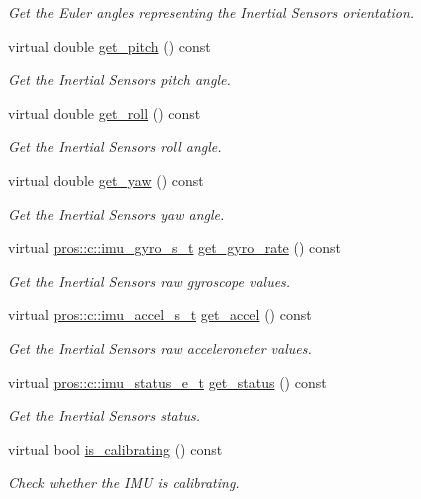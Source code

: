 \begin{DoxyCompactItemize}
\begin{DoxyCompactList}\small\item\em Get the Euler angles representing the Inertial Sensor\textquotesingle{}s orientation. \end{DoxyCompactList}\item 
virtual double \hyperlink{classpros_1_1Imu_a9d9e7ad1da6ea8877c48e1b4fadfe8ee}{get\+\_\+pitch} () const
\begin{DoxyCompactList}\small\item\em Get the Inertial Sensor\textquotesingle{}s pitch angle. \end{DoxyCompactList}\item 
virtual double \hyperlink{classpros_1_1Imu_a8ec8c7bbb7ee9d9d1c9dca5d992c57b1}{get\+\_\+roll} () const
\begin{DoxyCompactList}\small\item\em Get the Inertial Sensor\textquotesingle{}s roll angle. \end{DoxyCompactList}\item 
virtual double \hyperlink{classpros_1_1Imu_aa2dd2dec5b1a91d4358c23afd8f0f1bd}{get\+\_\+yaw} () const
\begin{DoxyCompactList}\small\item\em Get the Inertial Sensor\textquotesingle{}s yaw angle. \end{DoxyCompactList}\item 
virtual \hyperlink{imu_8h_a5b9e240cfb181cce3c741e29efbbbf23}{pros\+::c\+::imu\+\_\+gyro\+\_\+s\+\_\+t} \hyperlink{classpros_1_1Imu_a632aecd3cf0866827ba6521dc19f357d}{get\+\_\+gyro\+\_\+rate} () const
\begin{DoxyCompactList}\small\item\em Get the Inertial Sensor\textquotesingle{}s raw gyroscope values. \end{DoxyCompactList}\item 
virtual \hyperlink{imu_8h_a70eb3173193f4f46266eade4c243f662}{pros\+::c\+::imu\+\_\+accel\+\_\+s\+\_\+t} \hyperlink{classpros_1_1Imu_ac9a047f46e7ae8d73a6189091df20150}{get\+\_\+accel} () const
\begin{DoxyCompactList}\small\item\em Get the Inertial Sensor\textquotesingle{}s raw acceleroneter values. \end{DoxyCompactList}\item 
virtual \hyperlink{imu_8h_a7d3682de24c3a459dddda55d65793309}{pros\+::c\+::imu\+\_\+status\+\_\+e\+\_\+t} \hyperlink{classpros_1_1Imu_ad38c8f55b89f8d2e7b68a6bda0029559}{get\+\_\+status} () const
\begin{DoxyCompactList}\small\item\em Get the Inertial Sensor\textquotesingle{}s status. \end{DoxyCompactList}\item 
virtual bool \hyperlink{classpros_1_1Imu_af7426c086f6f810cca98f4e77765189c}{is\+\_\+calibrating} () const
\begin{DoxyCompactList}\small\item\em Check whether the I\+MU is calibrating. \end{DoxyCompactList}\end{DoxyCompactItemize}


